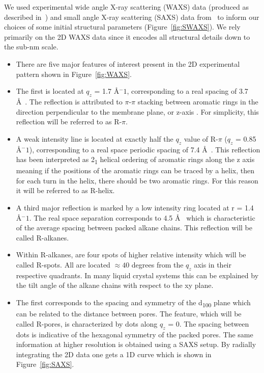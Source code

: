 \documentclass{article}
\newcommand{\angstrom}{\textup{\AA}}
\begin{document}
  We used experimental wide angle X-ray scattering (WAXS) data (produced as described 
  in~\cite{feng_scalable_2014}) and small angle X-ray scattering (SAXS) data from~\cite{feng_thin_2016}
  to inform our choices of some initial structural parameters (Figure~\ref{fig:SWAXS}). We rely primarily
  on the 2D WAXS data since it encodes all structural details down to the sub-nm scale.
  \begin{itemize}
        \item There are five major features of interest present in the 2D experimental
        pattern shown in Figure~\ref{fig:WAXS}.
        \item The first is located at $q_z$ = 1.7 \angstrom$^-1$,
        corresponding to a real spacing of 3.7 \angstrom~. The reflection is
        attributed to $\pi$-$\pi$ stacking between aromatic rings in the direction
        perpendicular to the membrane plane, or z-axis \cite{feng_scalable_2014}. For simplicity, this
        reflection will be referred to as R-$\pi$.
        \item A weak intensity line is located at exactly half the $q_z$ value of
        R-$\pi$ ($q_z$ = 0.85 \angstrom$^-1$), corresponding to a
        real space periodic spacing of 7.4 \angstrom~. This reflection has been
        interpreted  as 2\textsubscript{1} helical ordering of aromatic rings
        along the z axis meaning if the positions of the aromatic rings can
        be traced by a helix, then for each turn in the helix, there should be
        two aromatic rings. For this reason it will be referred to as R-helix.
        \item A third major reflection is marked by a low intensity ring located
        at r = 1.4 \angstrom$^-1$. The real space separation
        corresponds to 4.5 \angstrom~ which is characteristic of the average
        spacing between packed alkane chains. This reflection will be called R-alkanes.
        \item Within R-alkanes, are four spots of higher relative intensity which
        will be called R-spots. All are located $\approx 40$ degrees from the $q_z$ axis
        in their respective quadrants. In many liquid crystal systems this can be
        explained by the tilt angle of the alkane chains with respect to the xy plane. %
        \item The first corresponds to the spacing and symmetry of
        the d\textsubscript{100} plane which can be related to the distance between
        pores. The feature, which will be called R-pores, is characterized by dots
        along $q_z$ = 0. The spacing between dots is indicative of the hexagonal
        symmetry of the packed pores. The same information at higher resolution is obtained using a SAXS
        setup. By radially integrating the 2D data one gets a 1D curve which is 
        shown in Figure~\ref{fig:SAXS}.  %
  \end{itemize}
\end{document}

